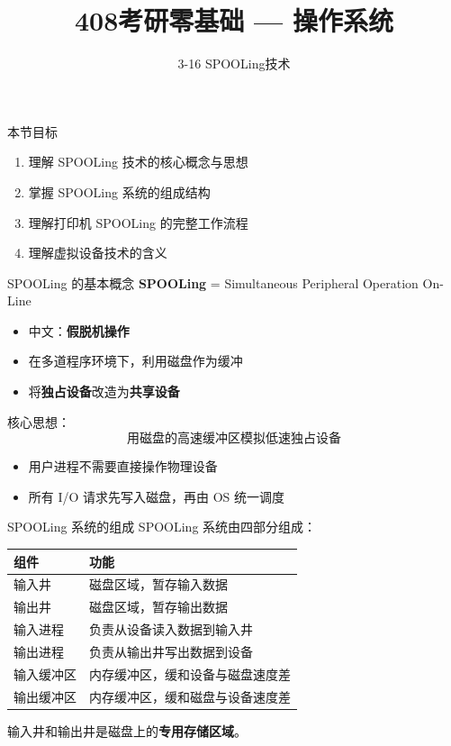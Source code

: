 \documentclass[10pt, aspectratio=169]{beamer}
\title{408考研零基础 --- 操作系统}
\subtitle{3-16 SPOOLing技术}
\author{}
\date{}
\begin{document}
\begin{frame}{本节目标}
    \begin{enumerate}
        \item 理解 SPOOLing 技术的核心概念与思想
        \item 掌握 SPOOLing 系统的组成结构
        \item 理解打印机 SPOOLing 的完整工作流程
        \item 理解虚拟设备技术的含义
    \end{enumerate}
\end{frame}

\begin{frame}{SPOOLing 的基本概念}
    \textbf{SPOOLing} = Simultaneous Peripheral Operation On-Line
    \vspace{0.5em}
    \begin{itemize}
        \item 中文：\textbf{假脱机操作}
        \item 在多道程序环境下，利用磁盘作为缓冲
        \item 将\textbf{独占设备}改造为\textbf{共享设备}
    \end{itemize}
    \vspace{0.5em}
    核心思想：
    \[
    \boxed{\text{用磁盘的高速缓冲区模拟低速独占设备}}
    \]
    \vspace{0.5em}
    \begin{itemize}
        \item 用户进程不需要直接操作物理设备
        \item 所有 I/O 请求先写入磁盘，再由 OS 统一调度
    \end{itemize}
\end{frame}

\begin{frame}{SPOOLing 系统的组成}
    SPOOLing 系统由四部分组成：
    \vspace{0.5em}
    \begin{center}
        \begin{tabular}{|l|l|}
            \hline
            \textbf{组件} & \textbf{功能} \\
            \hline
            输入井 & 磁盘区域，暂存输入数据 \\
            输出井 & 磁盘区域，暂存输出数据 \\
            输入进程 & 负责从设备读入数据到输入井 \\
            输出进程 & 负责从输出井写出数据到设备 \\
            输入缓冲区 & 内存缓冲区，缓和设备与磁盘速度差 \\
            输出缓冲区 & 内存缓冲区，缓和磁盘与设备速度差 \\
            \hline
        \end{tabular}
    \end{center}
    \vspace{0.5em}
    输入井和输出井是磁盘上的\textbf{专用存储区域}。
\end{frame}
\end{document}
